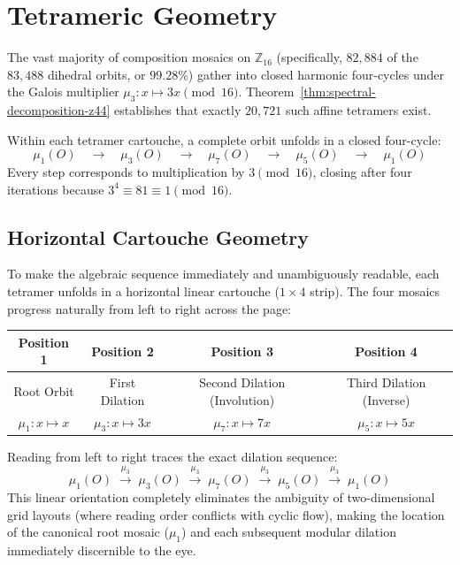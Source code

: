 \section{Tetrameric Geometry}
\label{sec:tetramers-and-scale-models}

The vast majority of composition mosaics on $\mathbb{Z}_{16}$ (specifically, $82{,}884$ of the $83{,}488$ dihedral orbits, or $99.28\%$) gather into closed harmonic four-cycles under the Galois multiplier $\mu_3 \colon x \mapsto 3x \pmod{16}$. Theorem~\ref{thm:spectral-decomposition-z44} establishes that exactly $20{,}721$ such affine tetramers exist.

Within each tetramer cartouche, a complete orbit unfolds in a closed four-cycle:
\begin{equation}
\label{eqn:tetramer-progression}
\mu_1(O) \quad\longrightarrow\quad \mu_3(O) \quad\longrightarrow\quad \mu_7(O) \quad\longrightarrow\quad \mu_5(O) \quad\longrightarrow\quad \mu_1(O)
\end{equation}
Every step corresponds to multiplication by $3 \pmod{16}$, closing after four iterations because $3^4 \equiv 81 \equiv 1 \pmod{16}$.

\subsection{Horizontal Cartouche Geometry}

To make the algebraic sequence immediately and unambiguously readable, each tetramer unfolds in a horizontal linear cartouche ($1 \times 4$ strip). The four mosaics progress naturally from left to right across the page:
\begin{center}
\small
\begin{tabular}{cccc}
\toprule
\textbf{Position 1} & \textbf{Position 2} & \textbf{Position 3} & \textbf{Position 4} \\
\midrule
Root Orbit & First Dilation & Second Dilation (Involution) & Third Dilation (Inverse) \\
$\mu_1 \colon x \mapsto x$ & $\mu_3 \colon x \mapsto 3x$ & $\mu_7 \colon x \mapsto 7x$ & $\mu_5 \colon x \mapsto 5x$ \\
\bottomrule
\end{tabular}
\end{center}
Reading from left to right traces the exact dilation sequence:
\[
\mu_1(O) \;\xrightarrow{\mu_3}\; \mu_3(O) \;\xrightarrow{\mu_3}\; \mu_7(O) \;\xrightarrow{\mu_3}\; \mu_5(O) \;\xrightarrow{\mu_3}\; \mu_1(O)
\]
This linear orientation completely eliminates the ambiguity of two-dimensional grid layouts (where reading order conflicts with cyclic flow), making the location of the canonical root mosaic ($\mu_1$) and each subsequent modular dilation immediately discernible to the eye.

